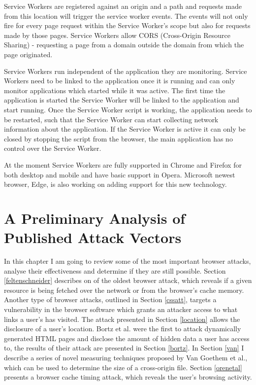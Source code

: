 \documentclass[10pt,a4paper,twoside]{book}
\begin{document}
Service Workers are registered against an origin and a path and requests made from this location will trigger the service worker events. The events will not only fire for every page request within the Service Worker's scope but also for requests made by those pages. Service Workers allow CORS (Cross-Origin Resource Sharing) - requesting a page from a domain outside the domain from which the page originated.

Service Workers run independent of the application they are monitoring. Service Workers need to be linked to the application once it is running and can only monitor applications which started while it was active. The first time the application is started the Service Worker will be linked to the application and start running. Once the Service Worker script is working, the application needs to be restarted, such that the Service Worker can start collecting network information about the application. If the Service Worker is active it can only be closed by stopping the script from the browser, the main application has no control over the Service Worker.

At the moment Service Workers are fully supported in Chrome and Firefox for both desktop and mobile and have basic support in Opera. Microsoft newest browser, Edge, is also working on adding support for this new technology.



\chapter{A Preliminary Analysis of Published Attack Vectors}
\label{chap:realtedWork}

In this chapter I am going to review some of the most important browser attacks, analyse their effectiveness and determine if they are still possible. Section \ref{feltenschneider} describes on of the oldest browser attack, which reveals if a given resource is being fetched over the network or from the browser's cache memory. Another type of browser attacks, outlined in Section \ref{cssatt}, targets a vulnerability in the browser software which grants an attacker access to what links a user's has visited. The attack presented in Section \ref{location} allows the disclosure of a user's location. Bortz et al.\cite{bortz2007exposing} were the first to attack dynamically generated HTML pages and disclose the amount of hidden data a user has access to, the results of their attack are presented in Section \ref{bortz}. In Section \ref{van} I describe a series of novel measuring techniques proposed by Van Goethem et al.\cite{van2015clock}, which can be used to determine the size of a cross-origin file. Section \ref{orenetal} presents a browser cache timing attack, which reveals the user's browsing activity.
\end{document}
